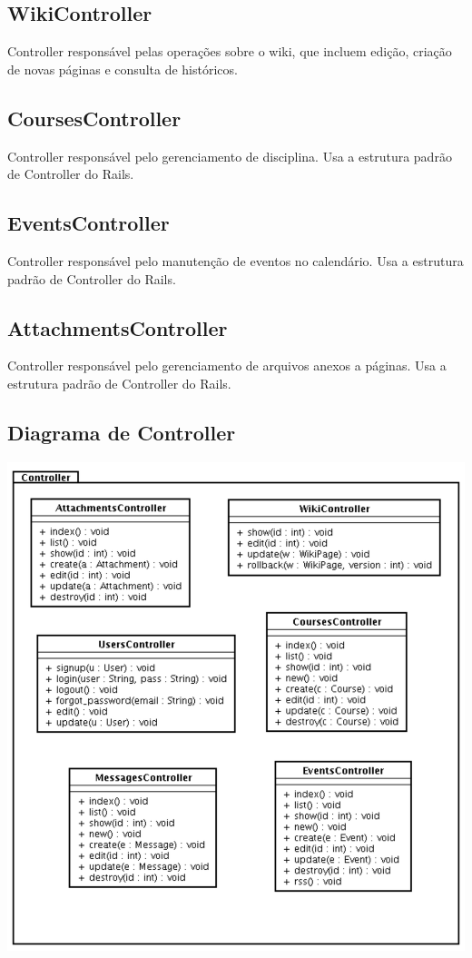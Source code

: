 \documentclass[11pt]{article}
\begin{document}
\subsection{WikiController}

Controller responsável pelas operações sobre o wiki, que incluem edição, criação de novas páginas e
consulta de históricos.

\subsection{CoursesController}

Controller responsável pelo gerenciamento de disciplina. Usa a estrutura padrão de Controller do
Rails.

\subsection{EventsController}

Controller responsável pelo manutenção de eventos no calendário. Usa a estrutura padrão de
Controller do Rails.

\subsection{AttachmentsController}

Controller responsável pelo gerenciamento de arquivos anexos a páginas. Usa a estrutura padrão de
Controller do Rails.

\subsection{Diagrama de Controller}

\includegraphics[width=150truemm]{classes-controller.pdf}
\end{document}
